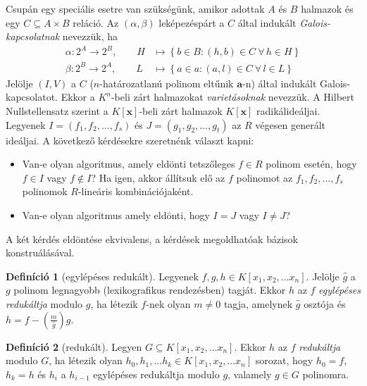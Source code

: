 \documentclass[DIV=15,appendixprefix]{scrreprt}
\theoremstyle{definition}
\newtheorem*{defin}{Definíció}
\theoremstyle{remark}
\begin{document}
%
Csupán egy speciális esetre van szükségünk, amikor adottak $ A $ és $ B $ halmazok és egy
$ C \subseteq A \times B $ reláció. Az $ \left( \alpha,{} \beta \right) $ leképezéspárt a $ C $
által indukált \emph{Galois-kapcsolatnak} nevezzük, ha
\begin{align*}
	\alpha \colon 2^{ A } \rightarrow 2^{ B }, \qquad H &\mapsto \left\{ b \in B \colon \left( h,{}
	b \right) \in C \  \forall\, h \in H \right\}\\
	\beta \colon 2^{ B } \rightarrow 2^{ A }, \qquad L &\mapsto \left\{ a \in a \colon \left( a,{}
	l \right) \in C \  \forall\, l \in L \right\}
\end{align*}
Jelölje $ \left( I,{} V \right) $ a $ C $ ($ n $-határozatlanú polinom eltűnik
$ \mathbf{ a } $-n) által indukált Galois-kapcsolatot. Ekkor a $ K^{ n } $-beli zárt halmazokat
\emph{varietásoknak} nevezzük. A Hilbert Nullstellensatz szerint a $ K \left[ \mathbf{ x }
\right] $-beli zárt halmazok $ K \left[ \mathbf{ x } \right] $ radikálideáljai.
%
Legyenek $ I = \left( f_{ 1 },{} f_{ 2 },{} \ldots,{} f_{ s } \right) $ és $ J = \left( g_{ 1 },{}
g_{ 2 },{} \ldots,{} g_{ t } \right) $ az $ R $ végesen generált ideáljai. A következő kérdésekre
szeretnénk választ kapni:
\begin{itemize}
	\item Van-e olyan algoritmus, amely eldönti tetszőleges $ f \in R $ polinom esetén, hogy $ f \in
		I $ vagy $ f \not\in I $? Ha igen, akkor állítsuk elő az $ f $ polinomot az $ f_{ 1 },{}
		f_{ 2 },{} \ldots,{} f_{ s }$ polinomok $ R $-lineáris kombinációjaként.
	\item Van-e olyan algoritmus amely eldönti, hogy $ I = J $ vagy $ I \neq J $?
\end{itemize}
A két kérdés eldöntése ekvivalens, a kérdések megoldhatóak  bázisok konstruálásával.
\begin{defin}[egylépéses redukált]
	Legyenek $ f,{} g,{} h \in K \left[ x_{ 1 },{} x_{ 2 },{} \ldots x_{ n } \right] $. Jelölje
	$ \hat{ g } $ a $g$ polinom legnagyobb (lexikografikus rendezésben) tagját. Ekkor $ h $ az $ f $
	\emph{egylépéses redukáltja} modulo $ g $, ha létezik $ f $-nek olyan $ m \neq 0 $ tagja,
	amelynek $ \hat{ g } $ osztója és $ h = f - \left( \frac{ m }{ \hat{ g } } \right)  g $.
\end{defin}
\begin{defin}[redukált]
	Legyen $ G \subseteq K \left[ x_{ 1 },{} x_{ 2 },{} \ldots x_{ n } \right] $. Ekkor $ h $ az
	$ f $ \emph{redukáltja} modulo $ G $, ha létezik olyan $ h_{ 0 },{} h_{ 1 },{} \ldots h_{ k }
	\in K \left[ x_{ 1 },{} x_{ 2 },{} \ldots x_{ n } \right] $ sorozat, hogy $ h_{ 0 } = f $,
	$ h_{ k } = h $ és $ h_{ i } $ a $h_{ i - 1 }$ egylépéses redukáltja modulo $ g $, valamely
	$ g \in G $ polinomra.
\end{defin}
\end{document}
